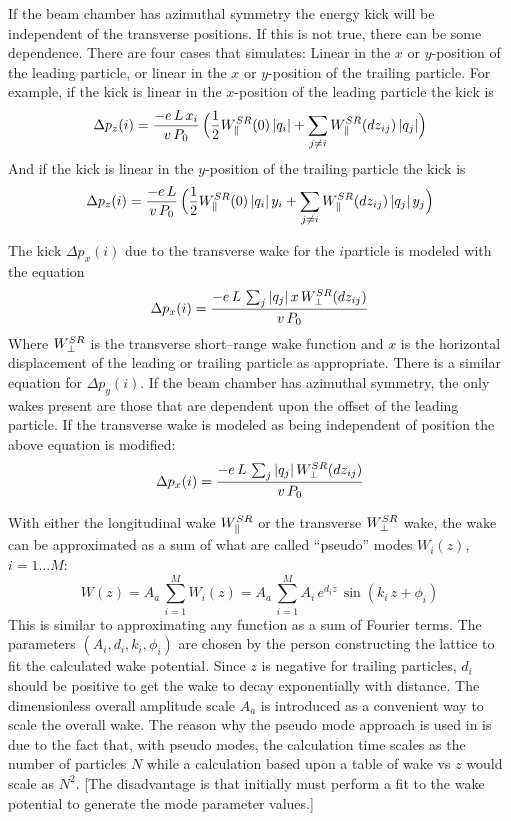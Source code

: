 If the beam chamber has azimuthal symmetry the energy kick will be independent of the transverse
positions. If this is not true, there can be some dependence. There are four cases that \bmad
simulates: Linear in the $x$ or $y$-position of the leading particle, or linear in the $x$ or
$y$-position of the trailing particle. For example, if the kick is linear in the $x$-position of the
leading particle the kick is
\begin{equation}
  \Delta p_z(i) = \frac{-e \, L \, x_i}{v \, P_0} \, \Bigl( \frac{1}{2}W^{SR}_\parallel(0) \,  |q_i| +
        \sum_{j \ne i} W^{SR}_\parallel(dz_{ij}) \, |q_j| \Bigr)
  \label{delvp2}
\end{equation}
And if the kick is linear in the $y$-position of the trailing particle the kick is
\begin{equation}
  \Delta p_z(i) = \frac{-e \, L}{v \, P_0} \, \Bigl( \frac{1}{2}W^{SR}_\parallel(0) \,  |q_i| \, y_i +
        \sum_{j \ne i} W^{SR}_\parallel(dz_{ij}) \, |q_j| \, y_j \Bigr)
  \label{delvp3}
\end{equation}

The kick $\Delta p_x(i)$ due to the transverse wake for the $i$\Th particle is modeled with the
equation
\begin{equation}
  \Delta p_x(i) = \frac{-e \, L \, \sum_j |q_j| \, x \, W^{SR}_\perp(dz_{ij})}{v \, P_0}
  \label{pelqxw1}
\end{equation}
Where $W^{SR}_\perp$ is the transverse short--range wake function and $x$ is the horizontal displacement of
the leading or trailing particle as appropriate. There is a similar equation for $\Delta p_y(i)$.
If the beam chamber has azimuthal symmetry, the only wakes present are those that are dependent upon
the offset of the leading particle. If the transverse wake is modeled as being independent of
position the above equation is modified:
\begin{equation}
  \Delta p_x(i) = \frac{-e \, L \, \sum_j |q_j| \, W^{SR}_\perp(dz_{ij})}{v \, P_0}
  \label{pelqxw2}
\end{equation}


With either the longitudinal wake $W^{SR}_\parallel$ or the transverse $W^{SR}_\perp$ wake, the wake can be
approximated as a sum of what are called ``pseudo'' modes $W_i(z)$, $i = 1 \ldots M$:
\begin{equation}
  W(z) = A_a \, \sum_{i = 1}^M W_i(z)
  = A_a \, \sum_{i = 1}^M A_i \, e^{d_i z} \, \sin (k_i \, z + \phi_i)
  \label{wadzk}
\end{equation}
This is similar to approximating any function as a sum of Fourier terms. The parameters $(A_i, d_i,
k_i, \phi_i)$ are chosen by the person constructing the lattice to fit the calculated wake
potential. Since $z$ is negative for trailing particles, $d_i$ should be positive to get the wake to
decay exponentially with distance. The dimensionless overall amplitude scale $A_a$ is introduced
as a convenient way to scale the overall wake. The reason why the pseudo mode approach is used in \bmad is
due to the fact that, with pseudo modes, the calculation time scales as the number of particles $N$
while a calculation based upon a table of wake vs $z$ would scale as $N^2$. [The disadvantage is
that initially must perform a fit to the wake potential to generate the mode parameter
values.]

